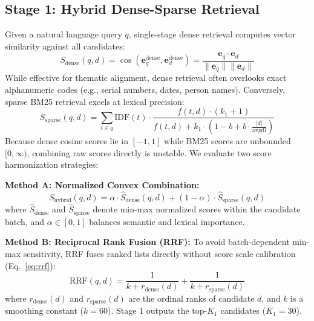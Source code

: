\documentclass[conference]{IEEEtran}
\begin{document}
\subsection{Stage 1: Hybrid Dense-Sparse Retrieval}
Given a natural language query $q$, single-stage dense retrieval computes vector similarity against all candidates:
\begin{equation}
    S_{\text{dense}}(q, d) = \cos(\mathbf{e}_q^{\text{dense}}, \mathbf{e}_d^{\text{dense}}) = \frac{\mathbf{e}_q \cdot \mathbf{e}_d}{\|\mathbf{e}_q\| \|\mathbf{e}_d\|}
\end{equation}
While effective for thematic alignment, dense retrieval often overlooks exact alphanumeric codes (e.g., serial numbers, dates, person names). Conversely, sparse BM25 retrieval excels at lexical precision:
\begin{equation}
    S_{\text{sparse}}(q, d) = \sum_{t \in q} \text{IDF}(t) \cdot \frac{f(t, d) \cdot (k_1 + 1)}{f(t, d) + k_1 \cdot \left(1 - b + b \cdot \frac{|d|}{\text{avgdl}}\right)}
\end{equation}
Because dense cosine scores lie in $[-1, 1]$ while BM25 scores are unbounded $[0, \infty)$, combining raw scores directly is unstable. We evaluate two score harmonization strategies:

\textbf{Method A: Normalized Convex Combination:}
\begin{equation}
    S_{\text{hybrid}}(q, d) = \alpha \cdot \hat{S}_{\text{dense}}(q, d) + (1 - \alpha) \cdot \hat{S}_{\text{sparse}}(q, d)
    \label{eq:hybrid}
\end{equation}
where $\hat{S}_{\text{dense}}$ and $\hat{S}_{\text{sparse}}$ denote min-max normalized scores within the candidate batch, and $\alpha \in [0, 1]$ balances semantic and lexical importance.

\textbf{Method B: Reciprocal Rank Fusion (RRF):}
To avoid batch-dependent min-max sensitivity, RRF \cite{cormack2009rrf} fuses ranked lists directly without score scale calibration (Eq.~\ref{eq:rrf}):
\begin{equation}
    \text{RRF}(q, d) = \frac{1}{k + r_{\text{dense}}(d)} + \frac{1}{k + r_{\text{sparse}}(d)}
    \label{eq:rrf}
\end{equation}
where $r_{\text{dense}}(d)$ and $r_{\text{sparse}}(d)$ are the ordinal ranks of candidate $d$, and $k$ is a smoothing constant ($k = 60$). Stage 1 outputs the top-$K_1$ candidates ($K_1 = 30$).
\end{document}
